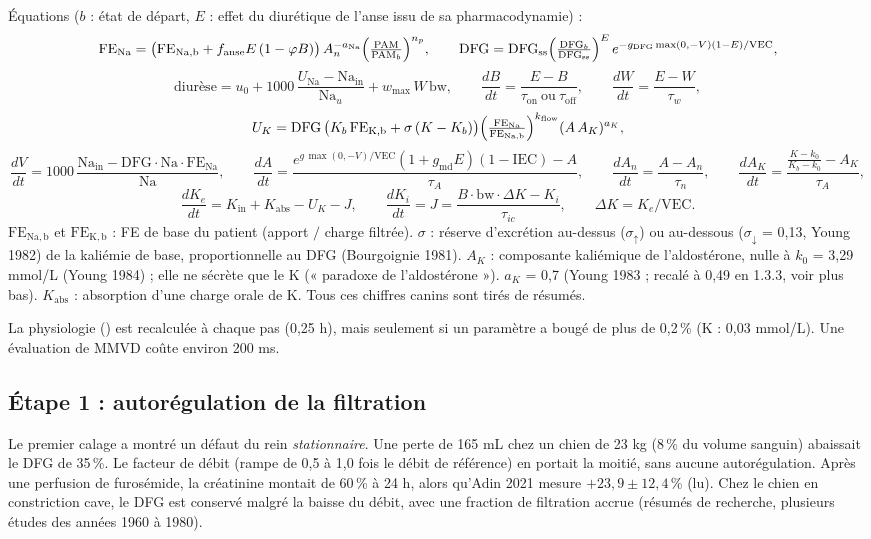 \documentclass[10pt,a4paper]{article}
\newcommand{\vp}[1]{\path{#1}}
\begin{document}
Équations ($b$ : état de départ, $E$ : effet du diurétique de l'anse issu de sa pharmacodynamie) :
\[
\mathrm{FE_{Na}} = \bigl(\mathrm{FE_{Na,b}} + f_\mathrm{anse}E\,(1-\varphi B)\bigr)\,A_n^{-a_\mathrm{Na}}\Bigl(\tfrac{\mathrm{PAM}}{\mathrm{PAM}_b}\Bigr)^{n_p},
\qquad
\mathrm{DFG} = \mathrm{DFG_{ss}}\Bigl(\tfrac{\mathrm{DFG}_b}{\mathrm{DFG_{ss}}}\Bigr)^{E}\,e^{-g_\mathrm{DFG}\max(0,-V)(1-E)/\mathrm{VEC}},
\]
\[
\text{diurèse} = u_0 + 1000\,\frac{U_\mathrm{Na} - \mathrm{Na_{in}}}{\mathrm{Na}_u} + w_\mathrm{max}\,W\,\mathrm{bw},\qquad
\frac{dB}{dt} = \frac{E - B}{\tau_\mathrm{on}\ \text{ou}\ \tau_\mathrm{off}},\qquad
\frac{dW}{dt} = \frac{E - W}{\tau_w},
\]
\[
U_K = \mathrm{DFG}\,\bigl(K_b\,\mathrm{FE_{K,b}} + \sigma\,(K - K_b)\bigr)\Bigl(\tfrac{\mathrm{FE_{Na}}}{\mathrm{FE_{Na,b}}}\Bigr)^{k_\mathrm{flow}} (A\,A_K)^{a_K},
\]
\[
\frac{dV}{dt} = 1000\,\frac{\mathrm{Na_{in}} - \mathrm{DFG}\cdot\mathrm{Na}\cdot\mathrm{FE_{Na}}}{\mathrm{Na}},\qquad
\frac{dA}{dt} = \frac{e^{g\,\max(0,-V)/\mathrm{VEC}}(1+g_\mathrm{md}E)(1-\mathrm{IEC}) - A}{\tau_A},\qquad \frac{dA_n}{dt} = \frac{A - A_n}{\tau_n},\qquad
\frac{dA_K}{dt} = \frac{\frac{K - k_0}{K_b - k_0} - A_K}{\tau_A},
\]
\[
\frac{dK_e}{dt} = K_\mathrm{in} + K_\mathrm{abs} - U_K - J,\qquad
\frac{dK_i}{dt} = J = \frac{B\cdot \mathrm{bw}\cdot\Delta K - K_i}{\tau_{ic}},\qquad \Delta K = K_e/\mathrm{VEC}.
\]
$\mathrm{FE_{Na,b}}$ et $\mathrm{FE_{K,b}}$ : FE de base du patient (apport $/$ charge filtrée). $\sigma$ : réserve d'excrétion au-dessus ($\sigma_\uparrow$) ou au-dessous ($\sigma_\downarrow$ = 0,13, Young 1982) de la kaliémie de base, proportionnelle au DFG (Bourgoignie 1981). $A_K$ : composante kaliémique de l'aldostérone, nulle à $k_0$ = 3,29 mmol/L (Young 1984) ; elle ne sécrète que le K (« paradoxe de l'aldostérone »). $a_K$ = 0,7 (Young 1983 ; recalé à 0,49 en 1.3.3, voir plus bas). $K_\mathrm{abs}$ : absorption d'une charge orale de K. Tous ces chiffres canins sont tirés de résumés.

La physiologie (\vp{evaluate}) est recalculée à chaque pas (0,25 h), mais seulement si un paramètre a bougé de plus de 0,2\,\% (K : 0,03 mmol/L). Une évaluation de MMVD coûte environ 200 ms.

\subsection{Étape 1 : autorégulation de la filtration}
Le premier calage a montré un défaut du rein \emph{stationnaire}. Une perte de 165 mL chez un chien de 23 kg (8\,\% du volume sanguin) abaissait le DFG de 35\,\%. Le facteur de débit (rampe de 0,5 à 1,0 fois le débit de référence) en portait la moitié, sans aucune autorégulation. Après une perfusion de furosémide, la créatinine montait de 60\,\% à 24 h, alors qu'Adin 2021 mesure $+23{,}9 \pm 12{,}4$\,\% (lu). Chez le chien en constriction cave, le DFG est conservé malgré la baisse du débit, avec une fraction de filtration accrue (résumés de recherche, plusieurs études des années 1960 à 1980).
\end{document}
